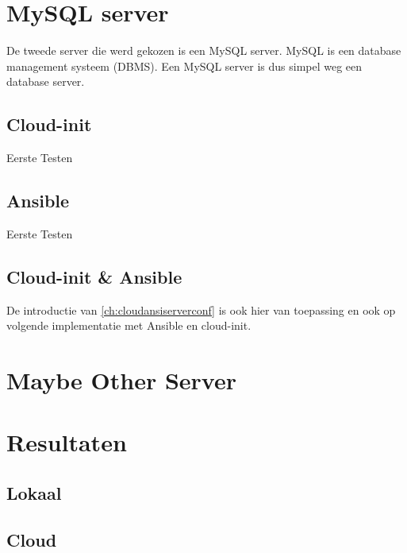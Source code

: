 \section{MySQL server}
De tweede server die werd gekozen is een MySQL server. MySQL is een database management systeem (DBMS). Een MySQL server is dus simpel weg een database server.

\subsection{Cloud-init}
Eerste Testen

\subsection{Ansible}
Eerste Testen

\subsection{Cloud-init \& Ansible}
De introductie van \ref*{ch:cloudansiserverconf} is ook hier van toepassing en ook op volgende implementatie met Ansible en cloud-init.

\section{Maybe Other Server}

\section{Resultaten}

\subsection{Lokaal}

\subsection{Cloud}
